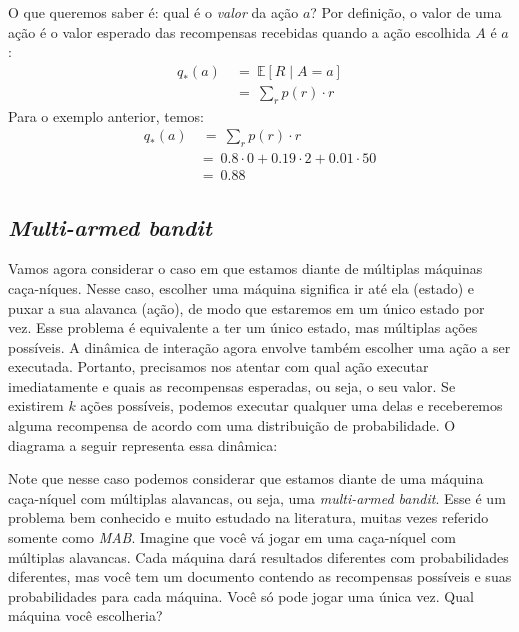 \documentclass{article}
\begin{document}
            O que queremos saber é: qual é o \emph{valor} da ação $a$? Por definição, o valor de uma ação é o valor esperado das recompensas recebidas quando a ação escolhida $A$ é $a$:
            \begin{equation}
            \begin{split}
                q_*(a) & \ = \ \mathbb{E}[R \mid A = a] \\
                & \ = \ \sum_{r}{} p(r) \cdot r
            \end{split}
            \end{equation}        
            Para o exemplo anterior, temos:            
            \begin{equation*}
            \begin{split}
                q_*(a) & \ = \ \sum_{r}{} p(r) \cdot r \\
                & = \ 0.8 \cdot 0 + 0.19 \cdot 2 + 0.01 \cdot 50 \\
                & = \ 0.88
            \end{split}
            \end{equation*}
            
        \subsection{\emph{Multi-armed bandit}}
    
            Vamos agora considerar o caso em que estamos diante de múltiplas máquinas caça-níques. Nesse caso, escolher uma máquina significa ir até ela (estado) e puxar a sua alavanca (ação), de modo que estaremos em um único estado por vez. Esse problema é equivalente a ter um único estado, mas múltiplas ações possíveis. A dinâmica de interação agora envolve também escolher uma ação a ser executada. Portanto, precisamos nos atentar com qual ação executar imediatamente e quais as recompensas esperadas, ou seja, o seu valor. Se existirem $k$ ações possíveis, podemos executar qualquer uma delas e receberemos alguma recompensa de acordo com uma distribuição de probabilidade. O diagrama a seguir representa essa dinâmica:
        
            \begin{center}
                \simplebandit
            \end{center}
                    
            Note que nesse caso podemos considerar que estamos diante de uma máquina caça-níquel com múltiplas alavancas, ou seja, uma \emph{multi-armed bandit}. Esse é um problema bem conhecido e muito estudado na literatura, muitas vezes referido somente como \emph{MAB}. Imagine que você vá jogar em uma caça-níquel com múltiplas alavancas. Cada máquina dará resultados diferentes com probabilidades diferentes, mas você tem um documento contendo as recompensas possíveis e suas probabilidades para cada máquina. Você só pode jogar uma única vez. Qual máquina você escolheria?
        
\end{document}
